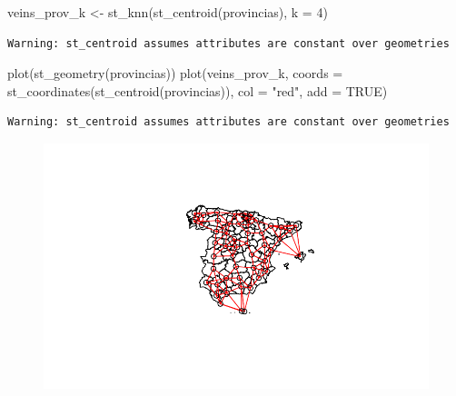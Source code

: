 \documentclass[
  letterpaper,
  DIV=11,
  numbers=noendperiod]{scrreprt}
\newenvironment{Shaded}{\begin{snugshade}}{\end{snugshade}}
\newcommand{\AttributeTok}[1]{\textcolor[rgb]{0.40,0.45,0.13}{#1}}
\newcommand{\ConstantTok}[1]{\textcolor[rgb]{0.56,0.35,0.01}{#1}}
\newcommand{\DecValTok}[1]{\textcolor[rgb]{0.68,0.00,0.00}{#1}}
\newcommand{\FunctionTok}[1]{\textcolor[rgb]{0.28,0.35,0.67}{#1}}
\newcommand{\NormalTok}[1]{\textcolor[rgb]{0.00,0.23,0.31}{#1}}
\newcommand{\OtherTok}[1]{\textcolor[rgb]{0.00,0.23,0.31}{#1}}
\newcommand{\StringTok}[1]{\textcolor[rgb]{0.13,0.47,0.30}{#1}}
\begin{document}
\begin{Shaded}
\begin{Highlighting}[]
\NormalTok{veins\_prov\_k }\OtherTok{\textless{}{-}} \FunctionTok{st\_knn}\NormalTok{(}\FunctionTok{st\_centroid}\NormalTok{(provincias), }\AttributeTok{k =} \DecValTok{4}\NormalTok{)}
\end{Highlighting}
\end{Shaded}

\begin{verbatim}
Warning: st_centroid assumes attributes are constant over geometries
\end{verbatim}

\begin{Shaded}
\begin{Highlighting}[]
\FunctionTok{plot}\NormalTok{(}\FunctionTok{st\_geometry}\NormalTok{(provincias))}
\FunctionTok{plot}\NormalTok{(veins\_prov\_k, }\AttributeTok{coords =} \FunctionTok{st\_coordinates}\NormalTok{(}\FunctionTok{st\_centroid}\NormalTok{(provincias)),}
     \AttributeTok{col =} \StringTok{"red"}\NormalTok{, }\AttributeTok{add =} \ConstantTok{TRUE}\NormalTok{)}
\end{Highlighting}
\end{Shaded}

\begin{verbatim}
Warning: st_centroid assumes attributes are constant over geometries
\end{verbatim}

\begin{figure}[H]

{\centering \includegraphics{04_AutocorrelacionEspacial_files/figure-pdf/unnamed-chunk-6-1.pdf}

}

\end{figure}
\end{document}
